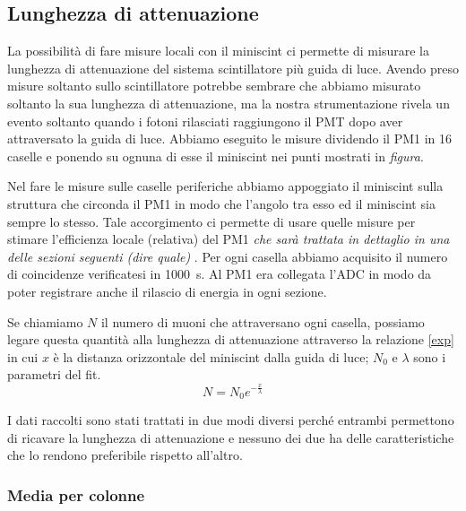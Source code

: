 
\subsection{Lunghezza di attenuazione}

La possibilità di fare misure locali con il miniscint 
ci permette di misurare la lunghezza di attenuazione del sistema scintillatore più guida di luce. Avendo preso misure soltanto sullo scintillatore potrebbe sembrare che abbiamo misurato soltanto la sua lunghezza di attenuazione, ma la nostra strumentazione rivela un evento soltanto quando i fotoni rilasciati raggiungono il PMT dopo aver attraversato la guida di luce. 
Abbiamo eseguito le misure dividendo il PM1 in 16 caselle e ponendo su ognuna di esse il miniscint nei punti mostrati in \emph{figura}. 

Nel fare le misure sulle caselle periferiche abbiamo appoggiato il miniscint sulla struttura che circonda il PM1 in modo che l'angolo tra esso ed il miniscint sia sempre lo stesso. Tale accorgimento ci permette di usare quelle misure per stimare l'efficienza locale (relativa) del PM1 \emph{che sarà trattata in dettaglio in una delle sezioni seguenti  (dire quale) }.                            
Per ogni casella abbiamo acquisito il numero di coincidenze verificatesi in \SI{1000}{s}. Al PM1 era collegata l'ADC in modo da poter registrare anche il rilascio di energia in ogni sezione.

Se chiamiamo $N$ il numero di muoni che attraversano ogni casella, possiamo legare questa quantità alla lunghezza di attenuazione attraverso la relazione \eqref{exp} in cui $x$ è la distanza orizzontale del miniscint dalla guida di luce; $N_0$ e $\lambda$ sono i parametri del fit. 
\begin{equation}
N=N_0 e^{-\frac{x}{\lambda}}  \label{exp}
\end{equation}

I dati raccolti sono stati trattati in due modi diversi perché entrambi permettono di ricavare la lunghezza di attenuazione e nessuno dei due ha delle caratteristiche che lo rendono preferibile rispetto all'altro.

\subsubsection{Media per colonne}


